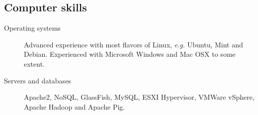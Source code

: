 \documentclass[margin,line,a4paper]{resume}
\begin{document}
\begin{resume}
%

    
    

\section{\mysidestyle Computer skills}\vspace{1mm}
\begin{description}
\item[Operating systems] Advanced experience with most flavors of Linux, \textit{e.g.} Ubuntu, Mint and Debian. Experienced with Microsoft Windows and Mac OSX to some extent.
    \item[Servers and databases] Apache2, NoSQL, GlassFish, MySQL, ESXI Hypervisor, VMWare vSphere, Apache Hadoop and Apache Pig.



\end{description}
\end{resume}
\end{document}
